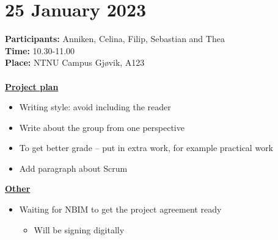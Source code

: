 \section{25 January 2023}

\textbf{Participants:} Anniken, Celina, Filip, Sebastian and Thea \\
\textbf{Time:} 10.30-11.00 \\
\textbf{Place:} NTNU Campus Gjøvik, A123
\\~\\
\textbf{\underline{Project plan}}
\begin{itemize}
    \item Writing style: avoid including the reader 
    \item Write about the group from one perspective
    \item To get better grade – put in extra work, for example practical work
    \item Add paragraph about Scrum 
\end{itemize}

 

\textbf{\underline{Other}} 
\begin{itemize}
    \item Waiting for NBIM to get the project agreement ready
    \begin{itemize}
        \item Will be signing digitally 
    \end{itemize}
\end{itemize}
